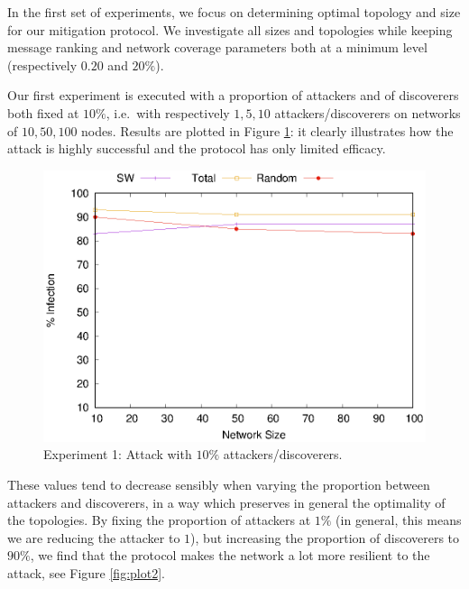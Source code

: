 \documentclass[compsoc, conference, letterpaper, 10pt, times]{IEEEtran}
\begin{document}
In the first set of experiments, we focus on determining optimal topology and size for our mitigation protocol. We investigate all sizes and topologies while keeping message ranking and network coverage parameters both at a minimum level (respectively $0.20$ and $20\%$).

Our first experiment is executed with a proportion of attackers and of discoverers both fixed at $10\%$, i.e.\ with respectively $1,5,10$ attackers/discoverers on networks of $10,50,100$ nodes. Results are plotted in Figure \ref{fig:plot1}: it clearly illustrates how the attack is highly successful and the protocol has only limited efficacy.

\begin{figure}
\includegraphics[scale=0.70]{1stconfig}
\caption{Experiment 1: Attack with $10\%$ attackers/discoverers.}\label{fig:plot1}
\end{figure}
These values tend to decrease sensibly when varying the proportion between attackers and discoverers, in a way which preserves in general the optimality of the topologies. By fixing the proportion of attackers at $1\%$ (in general, this means we are reducing the attacker to $1$), but increasing the proportion of discoverers to $90\%$, we find that the protocol makes the network a lot more resilient to the attack, see Figure \ref{fig:plot2}.
\end{document}
